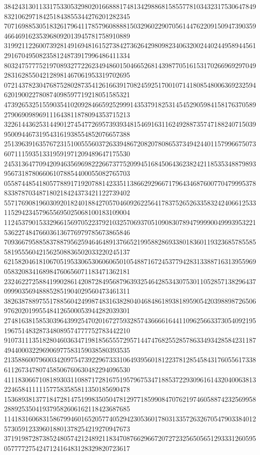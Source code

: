 \begin{DoxyCode}
      384243130113317533053298020166888174813429886815855778103432317530647849832106297184251843855344276201282345
      707169885305183261796411785796088881503296022907056144762209150947390359466469162353968092013945781758910889
      319921122600739281491694816152738427362642980982340632002440244958944561291670495082358124873917996486411334
      803247577752197089327722623494860150466526814398770516153170266969297049283162855042128981467061953319702695
      072143782304768752802873541261663917082459251700107141808548006369232594620190022780874098597719218051585321
      473926532515590354102092846659252999143537918253145452905984158176370589279069098969111643811878094353715213
      322614436253144901274547726957393934815469163116249288735747188240715039950094467319543161938554852076657388
      251396391635767231510055560372633948672082078086537349424401157996675073607111593513319591971209489647175530
      245313647709420946356969822266737752099451684506436238242118535348879893956731878066061078854400055082765703
      055874485418057788917192078814233511386629296671796434687600770479995378833878703487180218424373421122739402
      557176908196030920182401884270570460926225641783752652633583242406612533115294234579655695025068100183109004
      112453790153329661569705223792103257069370510908307894799990049993953221536227484766036136776979785673865846
      709366795885837887956259464648913766521995882869338018360119323685785585581955560421562508836502033220245137
      621582046181067051953306530606065010548871672453779428313388716313955969058320834168984760656071183471362181
      232462272588419902861420872849568796393254642853430753011052857138296437099903569488852851904029560473461311
      382638788975517885604249987483163828040468486189381895905420398898726506976202019955484126500053944282039301
      274816381585303964399254702016727593285743666616441109625663373054092195196751483287348089574777752783442210
      910731113518280460363471981856555729571447476825528578633493428584231187494400032296906977583159038580393535
      213588600796003420975473922967333106493956018122378128545843176055617338611267347807458506760630482294096530
      411183066710818930311088717281675195796753471885372293096161432040063813224658411111577583585811350185690478
      153689381377184728147519983505047812977185990847076219746058874232569958288925350419379582606162118423687685
      114183160683158679946016520577405294230536017803133572632670547903384012573059123396018801378254219270947673
      371919872873852480574212489211834708766296672072723256505651293331260595057777275424712416483128329820723617

\end{DoxyCode}
